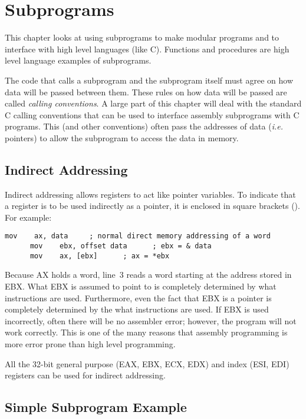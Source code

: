 \chapter{Subprograms}

This chapter looks at using subprograms to make modular programs and to
interface with high level languages (like C). Functions and procedures are
high level language examples of subprograms.

The code that calls a subprogram and the subprogram itself must agree
on how data will be passed between them. These rules on how data will
be passed are called \emph{calling conventions}.  A large part of this chapter will deal with the standard C
calling conventions that can be used to interface assembly subprograms
with C programs. This (and other conventions) often pass the addresses
of data (\emph{i.e.} pointers) to allow the subprogram to access the
data in memory.

\section{Indirect Addressing}

Indirect addressing allows registers to act like pointer variables. To
indicate that a register is to be used indirectly as a pointer, it is
enclosed in square brackets ({\code []}). For example:
\begin{lstlisting}[language={[x86masm]Assembler}]
      mov    ax, data     ; normal direct memory addressing of a word
      mov    ebx, offset data      ; ebx = & data
      mov    ax, [ebx]      ; ax = *ebx
\end{lstlisting}
Because AX holds a word, line~3 reads a word starting at the address stored 
in EBX.  What EBX is assumed to point to is completely determined by what
instructions are used. Furthermore, even the fact that EBX is a pointer is
completely determined by the what instructions are used. If EBX is used
incorrectly, often there will be no assembler error; however, the program
will not work correctly. This is one of the many reasons that assembly
programming is more error prone than high level programming.

All the 32-bit general purpose (EAX, EBX, ECX, EDX) and index (ESI, EDI)
registers can be used for indirect addressing. 

\section{Simple Subprogram Example}

